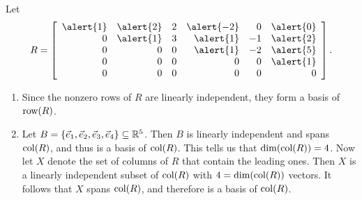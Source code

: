 \documentclass[pdf,9pt]{beamer}
\begin{document}
\begin{frame}[fragile]
\begin{example}
    Let \[
      R=\left[\begin{array}{rrrrrr}
        \alert{1} & \alert{2} & 2 & \alert{-2} & 0  & \alert{0} \\
        0         & \alert{1} & 3 & \alert{1}  & -1 & \alert{2} \\
        0         & 0         & 0 & \alert{1}  & -2 & \alert{5} \\
        0         & 0         & 0 & 0          & 0  & \alert{1} \\
        0         & 0         & 0 & 0          & 0  & 0
    \end{array}\right].
  \]
  \begin{enumerate}
    \item Since the nonzero rows of $R$ are linearly independent, they form a
      basis of $\mbox{row}(R)$.
	\pause
    \item Let $B=\{ \vec{e}_1, \vec{e}_2, \vec{e}_3, \vec{e}_4\}\subseteq
      \mathbb{R}^5$.  Then $B$ is linearly independent and spans $\mbox{col}(R)$, and thus
      is a basis of $\mbox{col}(R)$.  \alert{This tells us that $\dim(\mbox{col}(R))=4$.}
      Now let $X$ denote the set of columns of $R$ that contain the leading
      ones.
	\pause
    Then $X$ is a linearly independent subset of $\mbox{col}(R)$ with
    $4=\dim(\mbox{col}(R))$ vectors.
    It follows that $X$ spans $\mbox{col}(R)$, and therefore is a basis
    of $\mbox{col}(R)$.
\end{enumerate}
\end{example}
\end{frame}
\end{document}

